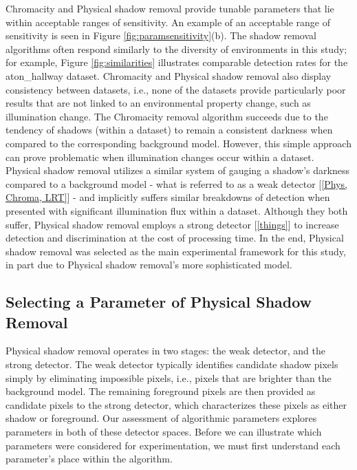 Chromacity and Physical shadow removal provide tunable parameters that lie within acceptable ranges of sensitivity. An example of an acceptable range of sensitivity is seen in Figure \ref{fig:paramsensitivity}(b). The shadow removal algorithms often respond similarly to the diversity of environments in this study; for example, Figure \ref{fig:similarities} illustrates comparable detection rates for the aton\_hallway dataset. Chromacity and Physical shadow removal also display consistency between datasets, i.e., none of the datasets provide particularly poor results that are not linked to an environmental property change, such as illumination change. The Chromacity removal algorithm succeeds due to the tendency of shadows (within a dataset) to remain a consistent darkness when compared to the corresponding background model. However, this simple approach can prove problematic when illumination changes occur within a dataset. Physical shadow removal utilizes a similar system of gauging a shadow's darkness compared to a background model - what is referred to as a weak detector [\ref{Phys, Chroma, LRT}] - and implicitly suffers similar breakdowns of detection when presented with significant illumination flux within a dataset. Although they both suffer, Physical shadow removal employs a strong detector [\ref{things}] to increase detection and discrimination at the cost of processing time. In the end, Physical shadow removal was selected as the main experimental framework for this study, in part due to Physical shadow removal's more sophisticated model.

\FloatBarrier
\subsection{Selecting a Parameter of Physical Shadow Removal} \label{section:selectparameter}

Physical shadow removal operates in two stages: the weak detector, and the strong detector. The weak detector typically identifies candidate shadow pixels simply by eliminating impossible pixels, i.e., pixels that are brighter than the background model. The remaining foreground pixels are then provided as candidate pixels to the strong detector, which characterizes these pixels as either shadow or foreground. Our assessment of algorithmic parameters explores parameters in both of these detector spaces. Before we can illustrate which parameters were considered for experimentation, we must first understand each parameter's place within the algorithm.

